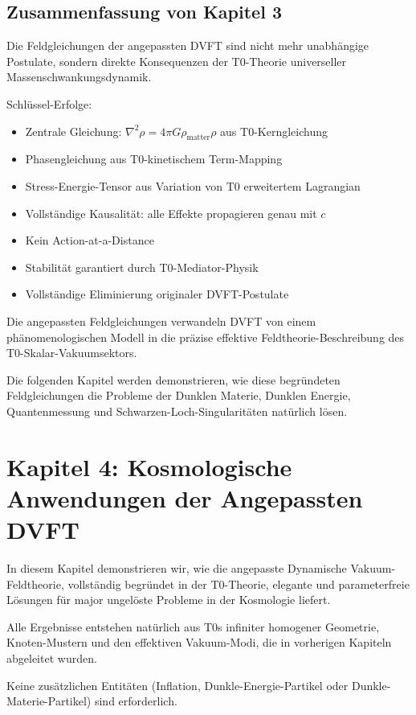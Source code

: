 	\subsection{Zusammenfassung von Kapitel 3}
	
	Die Feldgleichungen der angepassten DVFT sind nicht mehr unabhängige Postulate, sondern direkte Konsequenzen der T0-Theorie universeller Massenschwankungsdynamik.
	
	Schlüssel-Erfolge:
	\begin{itemize}
		\item Zentrale Gleichung: $\nabla^2 \rho = 4\pi G \rho_{\text{matter}} \rho$ aus T0-Kerngleichung
		\item Phasengleichung aus T0-kinetischem Term-Mapping
		\item Stress-Energie-Tensor aus Variation von T0 erweitertem Lagrangian
		\item Vollständige Kausalität: alle Effekte propagieren genau mit $c$
		\item Kein Action-at-a-Distance
		\item Stabilität garantiert durch T0-Mediator-Physik
		\item Vollständige Eliminierung originaler DVFT-Postulate
	\end{itemize}
	
	Die angepassten Feldgleichungen verwandeln DVFT von einem phänomenologischen Modell in die präzise effektive Feldtheorie-Beschreibung des T0-Skalar-Vakuumsektors.
	
	Die folgenden Kapitel werden demonstrieren, wie diese begründeten Feldgleichungen die Probleme der Dunklen Materie, Dunklen Energie, Quantenmessung und Schwarzen-Loch-Singularitäten natürlich lösen.
	
	\section{Kapitel 4: Kosmologische Anwendungen der Angepassten DVFT}
	
	In diesem Kapitel demonstrieren wir, wie die angepasste Dynamische Vakuum-Feldtheorie, vollständig begründet in der T0-Theorie, elegante und parameterfreie Lösungen für major ungelöste Probleme in der Kosmologie liefert.
	
	Alle Ergebnisse entstehen natürlich aus T0s infiniter homogener Geometrie, Knoten-Mustern und den effektiven Vakuum-Modi, die in vorherigen Kapiteln abgeleitet wurden.
	
	Keine zusätzlichen Entitäten (Inflation, Dunkle-Energie-Partikel oder Dunkle-Materie-Partikel) sind erforderlich.
	
